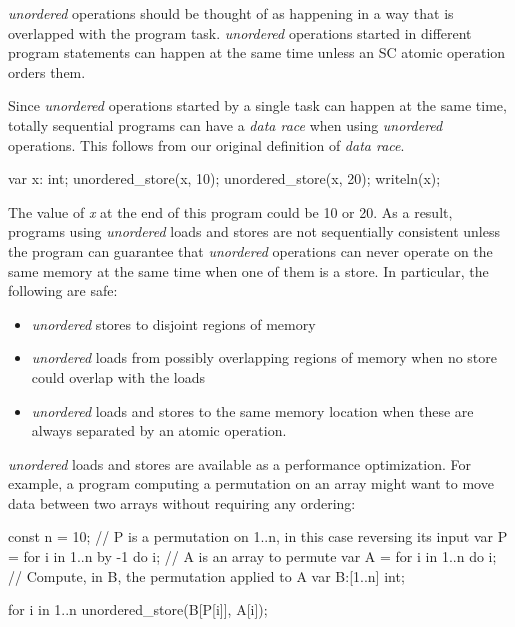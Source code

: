 \textit{unordered} operations should be thought of as happening in a way that
is overlapped with the program task. \textit{unordered} operations started in
different program statements can happen at the same time unless an SC atomic
operation orders them.

Since \textit{unordered} operations started by a single task can happen at
the same time, totally sequential programs can have a \textit{data race}
when using \textit{unordered} operations. This follows from our original
definition of \textit{data race}.

\begin{chapel}
var x: int;
unordered_store(x, 10);
unordered_store(x, 20);
writeln(x);
\end{chapel}

The value of \textit{x} at the end of this program could be 10 or 20. As a
result, programs using \textit{unordered} loads and stores are not sequentially
consistent unless the program can guarantee that \textit{unordered} operations
can never operate on the same memory at the same time when one of them is a
store. In particular, the following are safe:

\begin{itemize}
  \item \textit{unordered} stores to disjoint regions of memory
  \item \textit{unordered} loads from possibly overlapping regions of memory when no store could overlap with the loads
  \item \textit{unordered} loads and stores to the same memory location
  when these are always separated by an atomic operation.
\end{itemize}

\textit{unordered} loads and stores are available as a performance
optimization. For example, a program computing a permutation on an array might
want to move data between two arrays without requiring any ordering:

\begin{chapel}
const n = 10;
// P is a permutation on 1..n, in this case reversing its input
var P = for i in 1..n by -1 do i;
// A is an array to permute
var A = for i in 1..n do i;
// Compute, in B, the permutation applied to A
var B:[1..n] int;

for i in 1..n {
  unordered_store(B[P[i]], A[i]);
}
\end{chapel}

